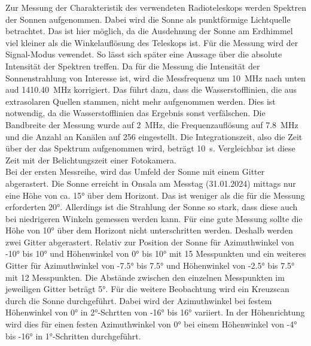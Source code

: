 \documentclass[../../main.tex]{subfiles}
\begin{document}
    Zur Messung der Charakteristik des verwendeten Radioteleskops werden Spektren der Sonnen aufgenommen. Dabei wird die Sonne als punktförmige Lichtquelle betrachtet. Das ist hier möglich, da die Ausdehnung der Sonne am Erdhimmel viel kleiner als die Winkelauflösung des Teleskops ist. Für die Messung wird der Signal-Modus vewendet. So lässt sich später eine Aussage über die absolute Intensität der Spektren treffen. Da für die Messung die Intensität der Sonnenstrahlung von Interesse ist, wird die Messfrequenz um \SI{10}{\mega \hertz} nach unten aud \SI{1410,40}{\mega \hertz} korrigiert. Das führt dazu, dass die Wasserstofflinien, die aus extrasolaren Quellen stammen, nicht mehr aufgenommen werden. Dies ist notwendig, da die Wasserstofflinien das Ergebnis sonst verfälschen. Die Bandbreite der Messung wurde auf \SI{2}{\mega \hertz}, die Frequenzauflösung auf \SI{7,8}{\mega \hertz} und die Anzahl an Kanälen auf 256 eingestellt. Die Integrationszeit, also die Zeit über der das Spektrum aufgenommen wird, beträgt \SI{10}{\second}. Vergleichbar ist diese Zeit mit der Belichtungszeit einer Fotokamera. \\
    Bei der ersten Messreihe, wird das Umfeld der Sonne mit einem Gitter abgerastert. Die Sonne erreicht in Onsala am Messtag (31.01.2024) mittags nur eine Höhe von ca. \ang{15} über dem Horizont. Das ist weniger als die für die Messung erforderten \ang{20}. Allerdings ist die Strahlung der Sonne so stark, dass diese auch bei niedrigeren Winkeln gemessen werden kann. Für eine gute Messung sollte die Höhe von \ang{10} über dem Horizont nicht unterschritten werden. Deshalb werden zwei Gitter abgerastert. Relativ zur Position der Sonne für Azimuthwinkel von \ang{-10} bis \ang{+10} und Höhenwinkel von \ang{0} bis \ang{10} mit 15 Messpunkten und ein weiteres Gitter für Azimuthwinkel von \ang{-7.5} bis \ang{+7.5} und Höhenwinkel von \ang{-2.5} bis \ang{7.5} mit 12 Messpunkten. Die Abstände zwischen den einzelnen Messpunkten im jeweiligen Gitter beträgt \ang{5}.
    Für die weitere Beobachtung wird ein Kreuzscan durch die Sonne durchgeführt. Dabei wird der Azimuthwinkel bei festem Höhenwinkel von \ang{0} in \ang{2}-Schrtten von \ang{-16} bis \ang{+16} variiert. In der Höhenrichtung wird dies für einen festen Azimuthwinkel von \ang{0} bei einem Höhenwinkel von \ang{-4} bis \ang{-16} in \ang{1}-Schritten durchgeführt.
\end{document}

